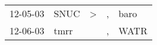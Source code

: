 \begin{supertabular}{p{0.07\textwidth}p{0.06\textwidth}p{0.02\textwidth}p{0.02\textwidth}p{0.06\textwidth}}
 12-05-03\textsuperscript{} &  SNUC\textsuperscript{} &  \textgreater &  , &  baro\textsuperscript{} \\
 12-06-03\textsuperscript{} &  tmrr\textsuperscript{} &               &  , &  WATR\textsuperscript{} \\
\end{supertabular}
